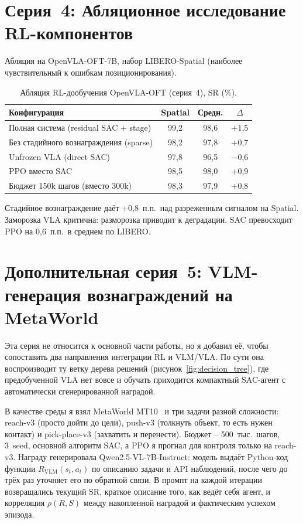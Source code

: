 \section{Серия~4: Абляционное исследование RL-компонентов}
\label{sec:ablation}

    Абляция на OpenVLA-OFT-7B, набор LIBERO-Spatial (наиболее чувствительный к ошибкам позиционирования).

\begin{table}[htbp]
\caption{Абляция RL-дообучения OpenVLA-OFT (серия~4), SR (\%).}
\label{tab:ablation}
\centering
\footnotesize
\setlength{\tabcolsep}{5pt}
\renewcommand{\arraystretch}{1.15}
\begin{tabularx}{\textwidth}{@{}>{\raggedright\arraybackslash}Xccc@{}}
\toprule
\textbf{Конфигурация} & \textbf{Spatial} & \textbf{Средн.} & \textbf{$\Delta$} \\
\midrule
Полная система (residual SAC + stage) & 99{,}2 & 98{,}6 & +1{,}5 \\
Без стадийного вознаграждения (sparse)  & 98{,}2 & 97{,}8 & +0{,}7 \\
Unfrozen VLA (direct SAC)              & 97{,}8 & 96{,}5 & $-$0{,}6 \\
PPO вместо SAC                           & 98{,}5 & 98{,}0 & +0{,}9 \\
Бюджет 150k шагов (вместо 300k)        & 98{,}3 & 97{,}9 & +0{,}8 \\
\bottomrule
\end{tabularx}
\end{table}

    Стадийное вознаграждение даёт +0,8~п.п.\ над разреженным сигналом на Spatial. Заморозка VLA критична: разморозка приводит к деградации. SAC превосходит PPO на 0,6~п.п.\ в среднем по LIBERO.

\section{Дополнительная серия~5: VLM-генерация вознаграждений на MetaWorld}
\label{sec:vlm_reward}

    Эта серия не относится к основной части работы, но я добавил её, чтобы сопоставить два направления интеграции RL и VLM/VLA. По сути она воспроизводит ту ветку дерева решений (рисунок~\ref{fig:decision_tree}), где предобученной VLA нет вовсе и обучать приходится компактный SAC-агент с автоматически сгенерированной наградой.

    В качестве среды я взял MetaWorld MT10~\cite{yu2020metaworld} и три задачи разной сложности: reach-v3 (просто дойти до цели), push-v3 (толкнуть объект, то есть нужен контакт) и pick-place-v3 (захватить и перенести). Бюджет -- 500~тыс.\ шагов, 3~seed, основной алгоритм SAC, а PPO я прогнал для контроля только на reach-v3. Награду генерировала Qwen2.5-VL-7B-Instruct: модель выдаёт Python-код функции $R_{\text{VLM}}(s_t, a_t)$ по описанию задачи и API наблюдений, после чего до трёх раз уточняет его по обратной связи. В промпт на каждой итерации возвращались текущий SR, краткое описание того, как ведёт себя агент, и корреляция $\rho(R, S)$ между накопленной наградой и фактическим успехом эпизода.

